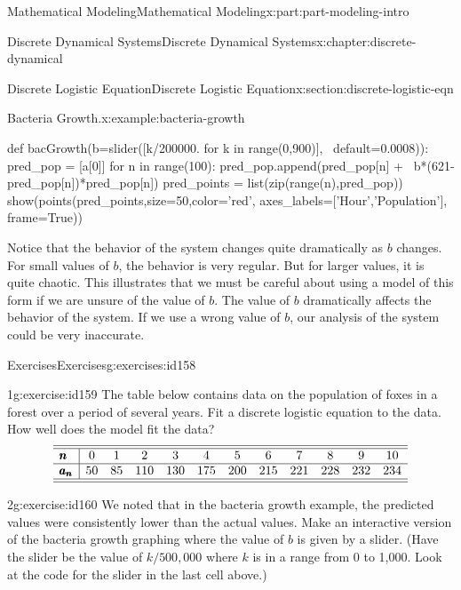 \documentclass[oneside,10pt,]{book}
\numberwithin{equation}{section}
\newcommand{\amp}{&}
\begin{document}
\begin{partptx}{Mathematical Modeling}{}{Mathematical Modeling}{}{}{x:part:part-modeling-intro}
\begin{chapterptx}{Discrete Dynamical Systems}{}{Discrete Dynamical Systems}{}{}{x:chapter:discrete-dynamical}
\begin{sectionptx}{Discrete Logistic Equation}{}{Discrete Logistic Equation}{}{}{x:section:discrete-logistic-eqn}
\begin{example}{Bacteria Growth.}{x:example:bacteria-growth}
\begin{sageinput}
def bacGrowth(b=slider([k/200000. for k in range(0,900)], \
					default=0.0008)):
    pred_pop = [a[0]]
    for n in range(100):
        pred_pop.append(pred_pop[n] + \
        b*(621-pred_pop[n])*pred_pop[n])
    pred_points = list(zip(range(n),pred_pop))
    show(points(pred_points,size=50,color='red',
               axes_labels=['Hour','Population'],
               frame=True))
\end{sageinput}
Notice that the behavior of the system changes quite dramatically as \(b\) changes. For small values of \(b\), the behavior is very regular. But for larger values, it is quite chaotic. This illustrates that we must be careful about using a model of this form if we are unsure of the value of \(b\). The value of \(b\) dramatically affects the behavior of the system. If we use a wrong value of \(b\), our analysis of the system could be very inaccurate.%
\end{example}
%
%
\typeout{************************************************}
\typeout{************************************************}
%
\begin{exercises-subsection-numberless}{Exercises}{}{Exercises}{}{}{g:exercises:id158}
\begin{divisionexercise}{1}{}{}{g:exercise:id159}%
The table below contains data on the population of foxes in a forest over a period of several years. Fit a discrete logistic equation to the data. How well does the model fit the data?%
%
\begin{equation*}
\begin{array}{l|ccccccccccc}\hline\hline
\pmb{n} \amp 0 \amp 1 \amp 2 \amp 3 \amp 4 \amp 5 \amp 6 \amp 7 \amp 8 \amp 9 \amp 10 \\\hline
\pmb{a_n} \amp 50 \amp 85 \amp 110 \amp 130 \amp 175 \amp 200 \amp 215 \amp 221 \amp 228 \amp 232 \amp 234 \\\hline\hline
\end{array}
\end{equation*}
\end{divisionexercise}%
\begin{divisionexercise}{2}{}{}{g:exercise:id160}%
We noted that in the bacteria growth example, the predicted values were consistently lower than the actual values. Make an interactive version of the bacteria growth graphing where the value of \(b\) is given by a slider. (Have the slider be the value of \(k/500,000\) where \(k\) is in a range from 0 to 1,000. Look at the code for the slider in the last cell above.)%
\end{divisionexercise}%

\end{exercises-subsection-numberless}
\end{sectionptx}
\end{chapterptx}
\end{partptx}
\end{document}
